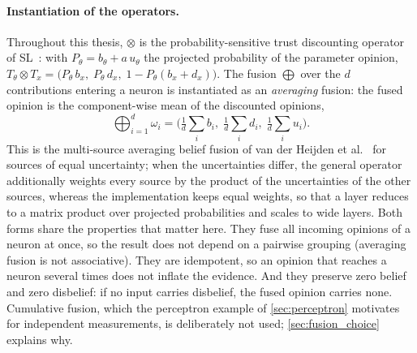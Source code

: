 \paragraph*{Instantiation of the operators.} Throughout this thesis, $\otimes$ is the probability-sensitive trust discounting operator of \ac{SL}~\cite{josang2016subjective}: with $P_\theta = b_\theta + a\,u_\theta$ the projected probability of the parameter opinion,
\(
T_\theta \otimes T_x = \big(P_\theta\, b_x,\; P_\theta\, d_x,\; 1 - P_\theta (b_x + d_x)\big).
\)
The fusion $\bigoplus$ over the $d$ contributions entering a neuron is instantiated as an \emph{averaging} fusion: the fused opinion is the component-wise mean of the discounted opinions,
\[
\bigoplus_{i=1}^{d} \omega_i = \Big(\tfrac{1}{d}\textstyle\sum_i b_i,\; \tfrac{1}{d}\sum_i d_i,\; \tfrac{1}{d}\sum_i u_i\Big).
\]
This is the multi-source averaging belief fusion of van der Heijden et al.~\cite{vanderheijden2018multisourcefusionoperationssubjective} for sources of equal uncertainty; when the uncertainties differ, the general operator additionally weights every source by the product of the uncertainties of the other sources, whereas the implementation keeps equal weights, so that a layer reduces to a matrix product over projected probabilities and scales to wide layers. Both forms share the properties that matter here. They fuse all incoming opinions of a neuron at once, so the result does not depend on a pairwise grouping (averaging fusion is not associative). They are idempotent, so an opinion that reaches a neuron several times does not inflate the evidence. And they preserve zero belief and zero disbelief: if no input carries disbelief, the fused opinion carries none. Cumulative fusion, which the perceptron example of \cref{sec:perceptron} motivates for independent measurements, is deliberately not used; \cref{sec:fusion_choice} explains why.

